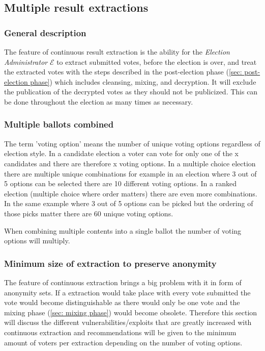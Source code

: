 \subsection{Multiple result extractions} \label{app: multiple result extractions}


\subsubsection{General description}
The feature of continuous result extraction is the ability for the \textit{Election Administrator} $\mathcal{E}$ to extract submitted votes, before the election is over, and treat the extracted votes with the steps described in the post-election phase (\cref{sec: post-election phase}) which includes cleansing, mixing, and decryption. It will exclude the publication of the decrypted votes as they should not be publicized. This can be done throughout the election as many times as necessary. 


\subsubsection{Multiple ballots combined}
The term 'voting option' means the number of unique voting options regardless of election style. In a candidate election a voter can vote for only one of the x candidates and there are therefore x voting options. In a multiple choice election there are multiple unique combinations for example in an election where 3 out of 5 options can be selected there are 10 different voting options. In a ranked election (multiple choice where order matters) there are even more combinations. In the same example where 3 out of 5 options can be picked but the ordering of those picks matter there are 60 unique voting options.

When combining multiple contents into a single ballot the number of voting options will multiply. 


\subsubsection{Minimum size of extraction to preserve anonymity}
The feature of continuous extraction brings a big problem with it in form of anonymity sets. If a extraction would take place with every vote submitted the vote would become distinguishable as there would only be one vote and the mixing phase (\cref{sec: mixing phase}) would become obsolete. Therefore this section will discuss the different vulnerabilities/exploits that are greatly increased with continuous extraction and recommendations will be given to the minimum amount of voters per extraction depending on the number of voting options. 

